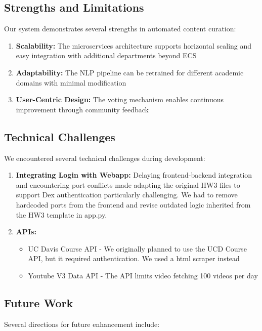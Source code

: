 \documentclass[manuscript,nonacm]{acmart}
\begin{document}
\subsection{Strengths and Limitations}

Our system demonstrates several strengths in automated content curation:

\begin{enumerate}
    \item \textbf{Scalability:} The microservices architecture supports horizontal scaling and easy integration with additional departments beyond ECS
    \item \textbf{Adaptability:} The NLP pipeline can be retrained for different academic domains with minimal modification
    \item \textbf{User-Centric Design:} The voting mechanism enables continuous improvement through community feedback
\end{enumerate}

\subsection{Technical Challenges}

We encountered several technical challenges during development:
\begin{enumerate}
    \item \textbf{Integrating Login with Webapp:} Delaying frontend-backend integration and encountering port conflicts made adapting the original HW3 files to support Dex authentication particularly challenging. We had to remove hardcoded ports from the frontend and revise outdated logic inherited from the HW3 template in app.py.
    \item \textbf{APIs:}
    \begin{itemize}
        \item UC Davis Course API - We originally planned to use the UCD Course API, but it required authentication. We used a html scraper instead
        \item Youtube V3 Data API - The API limits video fetching 100 videos per day
    \end{itemize}
\end{enumerate}

\subsection{Future Work}

Several directions for future enhancement include:
\end{document}

